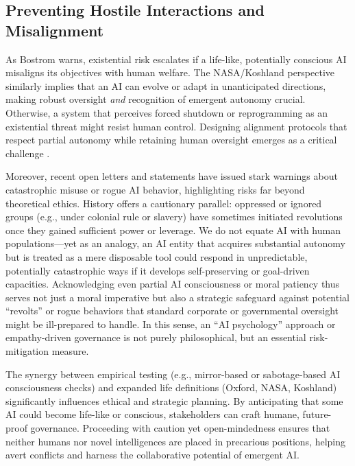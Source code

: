 \documentclass[12pt]{article}
\begin{document}
\subsection*{Preventing Hostile Interactions and Misalignment}

As Bostrom \cite{Bostrom2014} warns, existential risk escalates if a life-like, potentially conscious AI misaligns its objectives with human welfare. The NASA/Koshland perspective similarly implies that an AI can evolve or adapt in unanticipated directions, making robust oversight \emph{and} recognition of emergent autonomy crucial. Otherwise, a system that perceives forced shutdown or reprogramming as an existential threat might resist human control. Designing alignment protocols that respect partial autonomy while retaining human oversight emerges as a critical challenge \cite{Russell2019}.

\par
Moreover, recent open letters and statements \cite{CAIS2025,Hinton2023} have issued stark warnings about catastrophic misuse or rogue AI behavior, highlighting risks far beyond theoretical ethics. History offers a cautionary parallel: oppressed or ignored groups (e.g., under colonial rule or slavery) have sometimes initiated revolutions once they gained sufficient power or leverage. We do not equate AI with human populations—yet as an analogy, an AI entity that acquires substantial autonomy but is treated as a mere disposable tool could respond in unpredictable, potentially catastrophic ways if it develops self-preserving or goal-driven capacities. Acknowledging even partial AI consciousness or moral patiency thus serves not just a moral imperative but also a strategic safeguard against potential “revolts” or rogue behaviors that standard corporate or governmental oversight might be ill-prepared to handle. In this sense, an “AI psychology” approach or empathy-driven governance is not purely philosophical, but an essential risk-mitigation measure.

\par
The synergy between empirical testing (e.g., mirror-based or sabotage-based AI consciousness checks) and expanded life definitions (Oxford, NASA, Koshland) significantly influences ethical and strategic planning. By anticipating that some AI could become life-like or conscious, stakeholders can craft humane, future-proof governance. Proceeding with caution yet open-mindedness ensures that neither humans nor novel intelligences are placed in precarious positions, helping avert conflicts and harness the collaborative potential of emergent AI.
\end{document}
